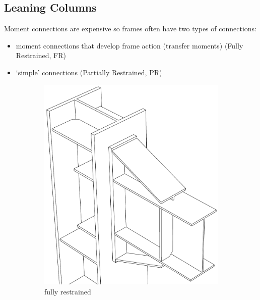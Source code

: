 \subsection{Leaning Columns}
Moment connections are expensive so frames often have two types of connections:
\begin{itemize}
\item moment connections that develop frame action (transfer moments) (Fully Restrained, FR)
\item `simple' connections (Partially Restrained, PR)
\end{itemize}
\begin{figure}[H]
\centering
\begin{subfigure}{.5\linewidth}\centering
\includegraphics[width=.9\linewidth]{PIC/CH04/FR}
\caption{fully restrained}
\end{subfigure}\hfil
\begin{subfigure}{.5\linewidth}\centering

\end{subfigure}
\end{figure}
